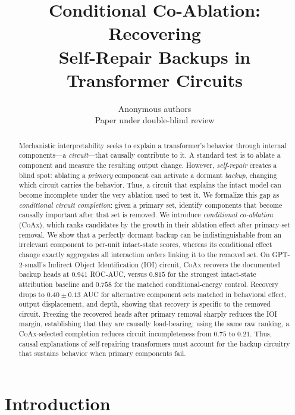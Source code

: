 \documentclass{article} %
\title{Conditional Co-Ablation: Recovering\\ \mbox{Self-Repair} Backups in Transformer Circuits}
\author{Anonymous authors\\
Paper under double-blind review}
\theoremstyle{plain}
\theoremstyle{definition}
\newcommand{\coax}{\textsc{CoAx}\xspace}
\begin{document}
\maketitle

\begin{abstract}
Mechanistic interpretability seeks to explain a transformer's behavior through internal components---a \emph{circuit}---that causally contribute to it.
A standard test is to ablate a component and measure the resulting output change.
However, \emph{self-repair} creates a blind spot: ablating a \emph{primary} component can activate a dormant \emph{backup}, changing which circuit carries the behavior.
Thus, a circuit that explains the intact model can become incomplete under the very ablation used to test it.
We formalize this gap as \emph{conditional circuit completion}: given a primary set, identify components that become causally important after that set is removed.
We introduce \emph{conditional co-ablation} (\coax), which ranks candidates by the growth in their ablation effect after primary-set removal.
We show that a perfectly dormant backup can be indistinguishable from an irrelevant component to per-unit intact-state scores, whereas its conditional effect change exactly aggregates all interaction orders linking it to the removed set.
On GPT-2-small's Indirect Object Identification (IOI) circuit, \coax recovers the documented backup heads at $0.941$ ROC-AUC, versus $0.815$ for the strongest intact-state attribution baseline and $0.758$ for the matched conditional-energy control.
Recovery drops to $0.40{\pm}0.13$ AUC for alternative component sets matched in behavioral effect, output displacement, and depth, showing that recovery is specific to the removed circuit.
Freezing the recovered heads after primary removal sharply reduces the IOI margin, establishing that they are causally load-bearing; using the same raw ranking, a \coax-selected completion reduces circuit incompleteness from $0.75$ to $0.21$.
Thus, causal explanations of self-repairing transformers must account for the backup circuitry that sustains behavior when primary components fail.
\end{abstract}


\section{Introduction}
\end{document}
